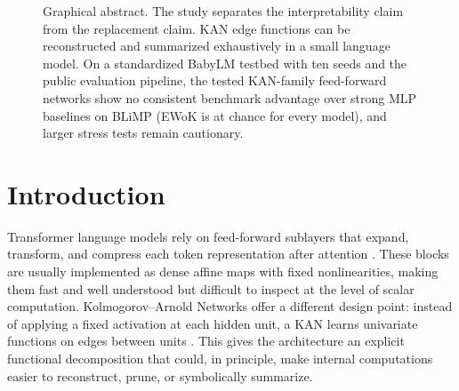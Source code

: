 \documentclass{article}
\newcommand{\modelname}[1]{\textsc{#1}}
\newcommand{\grkan}{\modelname{GR-KAN}}
\newcommand{\mlpedge}{\modelname{MLPEdge}}
\begin{document}
\begin{abstract}
\end{abstract}

\begin{figure}[t]
\centering
{}
\caption{Graphical abstract. The study separates the interpretability claim from the replacement claim. KAN edge functions can be reconstructed and summarized exhaustively in a small language model. On a standardized BabyLM testbed with ten seeds and the public evaluation pipeline, the tested KAN-family feed-forward networks show no consistent benchmark advantage over strong MLP baselines on BLiMP (EWoK is at chance for every model), and larger stress tests remain cautionary.}
\label{fig:graphical-abstract}
\end{figure}

\section{Introduction}

Transformer language models rely on feed-forward sublayers that expand, transform, and compress each token representation after attention \citep{vaswani2017attention}. These blocks are usually implemented as dense affine maps with fixed nonlinearities, making them fast and well understood but difficult to inspect at the level of scalar computation. Kolmogorov--Arnold Networks offer a different design point: instead of applying a fixed activation at each hidden unit, a KAN learns univariate functions on edges between units \citep{liu2024kan}. This gives the architecture an explicit functional decomposition that could, in principle, make internal computations easier to reconstruct, prune, or symbolically summarize.
\end{document}
